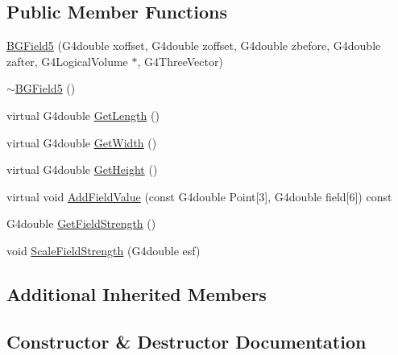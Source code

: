 \subsection*{Public Member Functions}
\begin{DoxyCompactItemize}
\item 
\hyperlink{classBGField5_afe5dd17ba8949f419920c47952dbe10b}{B\+G\+Field5} (G4double xoffset, G4double zoffset, G4double zbefore, G4double zafter, G4\+Logical\+Volume $\ast$, G4\+Three\+Vector)
\item 
\hyperlink{classBGField5_abcbf36e1b0d700552977f55cd65eed2b}{$\sim$\+B\+G\+Field5} ()
\item 
virtual G4double \hyperlink{classBGField5_aa003bda3eb139d5c6f1bddbbc7ee9a3f}{Get\+Length} ()
\item 
virtual G4double \hyperlink{classBGField5_aca250c0313214b8ca38d47df1e1a45d2}{Get\+Width} ()
\item 
virtual G4double \hyperlink{classBGField5_ab9cdd6f73808a2e8cfc1ad14bc0ee4bb}{Get\+Height} ()
\item 
virtual void \hyperlink{classBGField5_a85ddce900e965338562cd7d6b28eb08d}{Add\+Field\+Value} (const G4double Point\mbox{[}3\mbox{]}, G4double field\mbox{[}6\mbox{]}) const 
\item 
G4double \hyperlink{classBGField5_a7fcafffe48960675096f1693203ae437}{Get\+Field\+Strength} ()
\item 
void \hyperlink{classBGField5_a3298d0794e6914bfebe6550a6b08ee26}{Scale\+Field\+Strength} (G4double esf)
\end{DoxyCompactItemize}
\subsection*{Additional Inherited Members}


\subsection{Constructor \& Destructor Documentation}
